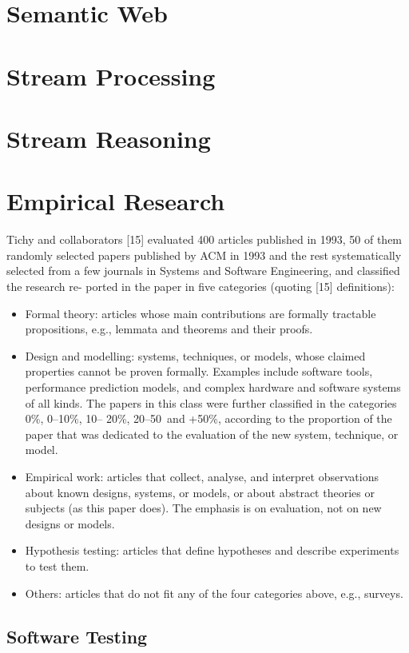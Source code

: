 \section{Semantic Web}
\section{Stream Processing}
\section{Stream Reasoning}
\section{Empirical Research}

Tichy and collaborators [15] evaluated 400 articles published in 1993, 50 of them randomly selected papers published by ACM in 1993 and the rest systematically selected from a few journals in Systems and Software Engineering, and classified the research re- ported in the paper in five categories (quoting [15] definitions): \begin{itemize}
\item Formal theory: articles whose main contributions are formally tractable propositions, e.g., lemmata and theorems and their proofs.
\item Design and modelling: systems, techniques, or models, whose claimed properties cannot be proven formally. Examples include software tools, performance prediction models, and complex hardware and software systems of all kinds. The papers in this class were further classified in the categories 0\%, 0–10\%, 10– 20\%, 20–50\, and +50\%, according to the proportion of the paper that was dedicated to the evaluation of the new system, technique, or model.
\item Empirical work: articles that collect, analyse, and interpret observations about known designs, systems, or models, or about abstract theories or subjects (as this paper does). The emphasis is on evaluation, not on new designs or models.
\item Hypothesis testing: articles that define hypotheses and describe experiments to test them.
\item Others: articles that do not fit any of the four categories above, e.g., surveys.
\end{itemize}

\subsection{Software Testing}
